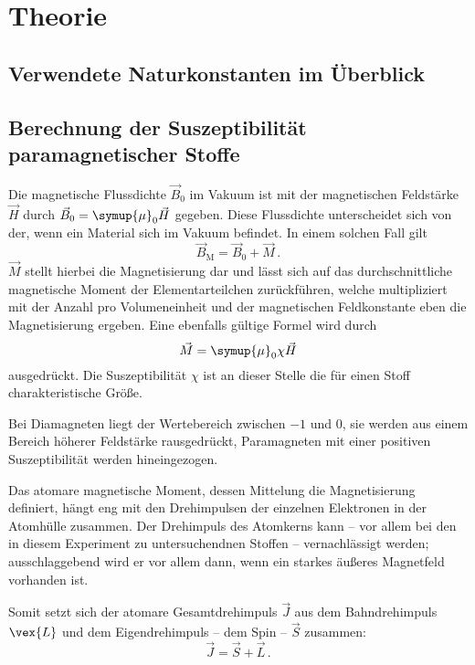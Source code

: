 \section{Theorie}
\label{sec:Theorie}

\subsection{Verwendete Naturkonstanten im Überblick}


\subsection{Berechnung der Suszeptibilität paramagnetischer Stoffe}

    Die magnetische Flussdichte $\vec{B}_0$ im Vakuum ist mit der magnetischen Feldstärke $\vec{H}$ durch ${\vec{B}_0=\symup{\mu}_0 \vec{H}}$
    gegeben. Diese Flussdichte unterscheidet sich von der, wenn ein Material sich im Vakuum befindet. 
    In einem solchen Fall gilt 
    \begin{equation*}
        \vec{B}_\text{M}= \vec{B}_0 + \vec{M} \,.
    \end{equation*}
    $\vec{M}$ stellt hierbei die Magnetisierung dar und lässt sich auf das durchschnittliche magnetische Moment der Elementarteilchen 
    zurückführen, welche multipliziert mit der Anzahl pro Volumeneinheit und der magnetischen Feldkonstante eben die Magnetisierung ergeben.
    Eine ebenfalls gültige Formel wird durch 
    \begin{equation*}
        \vec{M}=\symup{\mu}_0 \chi \vec{H}
    \end{equation*}
    ausgedrückt.
    Die Suszeptibilität $\chi$ ist an dieser Stelle die für einen Stoff charakteristische Größe. 

    Bei Diamagneten liegt der Wertebereich zwischen $-1$ und $0$, sie werden aus einem Bereich höherer Feldstärke rausgedrückt, 
    Paramagneten mit einer positiven Suszeptibilität werden hineingezogen. 

    Das atomare magnetische Moment, dessen Mittelung die Magnetisierung definiert, hängt eng mit den Drehimpulsen der einzelnen 
    Elektronen in der Atomhülle zusammen. 
    Der Drehimpuls des Atomkerns kann -- vor allem bei den in diesem Experiment zu untersuchendnen Stoffen -- vernachlässigt 
    werden; ausschlaggebend wird er vor allem dann, wenn ein starkes äußeres Magnetfeld vorhanden ist.

    Somit setzt sich der atomare Gesamtdrehimpuls $\vec{J}$ aus dem Bahndrehimpuls $\vex{L}$ und dem Eigendrehimpuls -- dem 
    Spin -- $\vec{S}$ zusammen:
    \begin{equation*}
        \vec{J}=\vec{S}+\vec{L} \,.
    \end{equation*}
    
